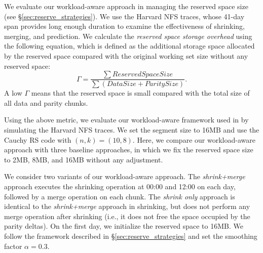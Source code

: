 We evaluate our workload-aware approach in managing the
reserved space size (see \S\ref{sec:reserve_strategies}). We use the Harvard
NFS traces, whose 41-day span provides long enough duration to examine the
effectiveness of shrinking, merging, and prediction.
We calculate the \textit{reserved space storage overhead} using the following
equation, which is defined as the additional storage space allocated by the
reserved space compared with the original working set size without any reserved
space:
%
\begin{equation*} \label{eq:overhead} \Gamma = \frac{\sum Reserved Space
        Size}{\sum (Data Size + Parity Size)}.
\end{equation*}
%
A low $\Gamma$ means that the reserved space is small
compared with the total size of all data and parity chunks. 

%



Using the above metric, we evaluate our workload-aware framework used in \PLR
by simulating the Harvard NFS traces. We set the segment size to 16MB and
use the Cauchy RS code \cite{blomer95} with $(n,k)=(10,8)$. 
Here, we compare our workload-aware approach with three baseline approaches,
in which we fix the reserved space size to 2MB, 8MB, and 16MB without
any adjustment.

We consider two variants of our workload-aware approach. The
\textit{shrink+merge} approach executes the shrinking operation at 00:00 and
12:00 on each day, followed by a merge operation on each chunk. The
\textit{shrink only} approach is identical to the \textit{shrink+merge}
approach in shrinking, but does not perform any merge operation after
shrinking (i.e., it does not free the space occupied by the parity deltas).
On the first day, we initialize the reserved space to 16MB.  We follow the
framework described in \S\ref{sec:reserve_strategies} and set the smoothing
factor $\alpha = 0.3$.


